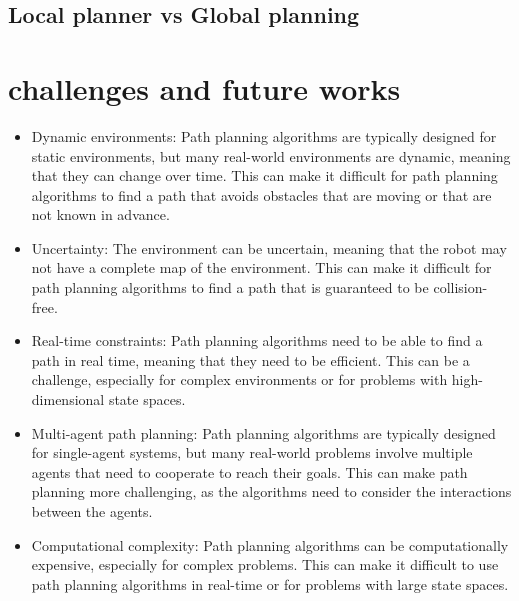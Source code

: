 \documentclass{article}
\begin{document}
\subsection{Local planner vs Global planning}
\begin{table}[ht]


\end{table}



\section{challenges and future works}
\begin{itemize}
\item Dynamic environments:
 Path planning algorithms are typically designed for static environments, but many real-world environments are dynamic, meaning that they can change over time. This can make it difficult for path planning algorithms to find a path that avoids obstacles that are moving or that are not known in advance.
\item Uncertainty:
The environment can be uncertain, meaning that the robot may not have a complete map of the environment. This can make it difficult for path planning algorithms to find a path that is guaranteed to be collision-free.
\item Real-time constraints:
Path planning algorithms need to be able to find a path in real time, meaning that they need to be efficient. This can be a challenge, especially for complex environments or for problems with high-dimensional state spaces.
\item Multi-agent path planning: 
Path planning algorithms are typically designed for single-agent systems, but many real-world problems involve multiple agents that need to cooperate to reach their goals. This can make path planning more challenging, as the algorithms need to consider the interactions between the agents.
\item Computational complexity: 
Path planning algorithms can be computationally expensive, especially for complex problems. This can make it difficult to use path planning algorithms in real-time or for problems with large state spaces.
\end{itemize}
\end{document}
